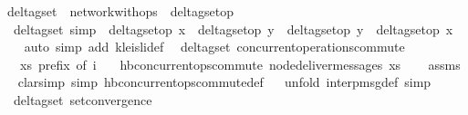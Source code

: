 \begin{isabellebody}%
\isamarkupfalse%
\ delta{\isacharunderscore}gset\ {\isacharequal}\ network{\isacharunderscore}with{\isacharunderscore}ops\ {\isacharunderscore}\ delta{\isacharunderscore}gset{\isacharunderscore}op\ {\isachardoublequoteopen}{\isacharbraceleft}{\isacharbraceright}{\isachardoublequoteclose}\isanewline
\isanewline
{}\isamarkupfalse%
\ {\isacharparenleft}\ delta{\isacharunderscore}gset{\isacharparenright}\ {\isacharbrackleft}simp{\isacharbrackright}\ {\isacharcolon}\ {\isachardoublequoteopen}delta{\isacharunderscore}gset{\isacharunderscore}op\ x\ {\isasymrhd}\ delta{\isacharunderscore}gset{\isacharunderscore}op\ y\ {\isacharequal}\ delta{\isacharunderscore}gset{\isacharunderscore}op\ y\ {\isasymrhd}\ delta{\isacharunderscore}gset{\isacharunderscore}op\ x{\isachardoublequoteclose}\isanewline
%
\isadelimproof
\ \ %
\endisadelimproof
%
\isatagproof
{}\isamarkupfalse%
\ {\isacharparenleft}auto\ simp\ add{\isacharcolon}\ kleisli{\isacharunderscore}def{\isacharparenright}\isanewline
{}\isamarkupfalse%
%
\endisatagproof
{\isafoldproof}%
%
\isadelimproof
\isanewline
%
\endisadelimproof
\isanewline
{}\isamarkupfalse%
\ {\isacharparenleft}\ delta{\isacharunderscore}gset{\isacharparenright}\ concurrent{\isacharunderscore}operations{\isacharunderscore}commute{\isacharcolon}\isanewline
\ \ \ {\isachardoublequoteopen}xs\ prefix\ of\ i{\isachardoublequoteclose}\isanewline
\ \ \ {\isachardoublequoteopen}hb{\isachardot}concurrent{\isacharunderscore}ops{\isacharunderscore}commute\ {\isacharparenleft}node{\isacharunderscore}deliver{\isacharunderscore}messages\ xs{\isacharparenright}{\isachardoublequoteclose}\isanewline
%
\isadelimproof
\ \ %
\endisadelimproof
%
\isatagproof
{}\isamarkupfalse%
\ assms\isanewline
\ \ \isamarkupfalse%
{\isacharparenleft}clarsimp\ simp{\isacharcolon}\ hb{\isachardot}concurrent{\isacharunderscore}ops{\isacharunderscore}commute{\isacharunderscore}def{\isacharparenright}\isanewline
\ \ \isamarkupfalse%
{\isacharparenleft}unfold\ interp{\isacharunderscore}msg{\isacharunderscore}def{\isacharcomma}\ simp{\isacharparenright}\isanewline
{}\isamarkupfalse%
%
\endisatagproof
{\isafoldproof}%
%
\isadelimproof
\isanewline
%
\endisadelimproof
\isanewline
{}\isamarkupfalse%
\ {\isacharparenleft}\ delta{\isacharunderscore}gset{\isacharparenright}\ set{\isacharunderscore}convergence{\isacharcolon}\isanewline

\end{isabellebody}
